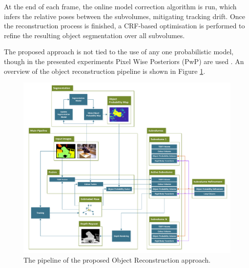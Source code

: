 At the end of each frame, the online model correction algorithm is run, which
infers the relative poses between the subvolumes, mitigating tracking drift.
Once the reconstruction process is finished, a CRF-based optimisation is 
performed to refine the resulting object segmentation over all subvolumes.

The proposed approach is not tied to the use of any one probabilistic model,
though in the presented experiments Pixel Wise Posteriors (PwP) are used
\cite{Bibby2008}. An overview of the object reconstruction pipeline is shown in
Figure \ref{fig:probobj_pipeline_diagram}.

\begin{figure}[ht]
  \label{fig:probobj_pipeline_diagram}
  \centering
  \includegraphics[width=\linewidth]{figures/object_recon/pipeline.pdf}
  \caption[Probabilistic Object Reconstruction Pipeline]
  {The pipeline of the proposed Object Reconstruction approach.}
\end{figure}

